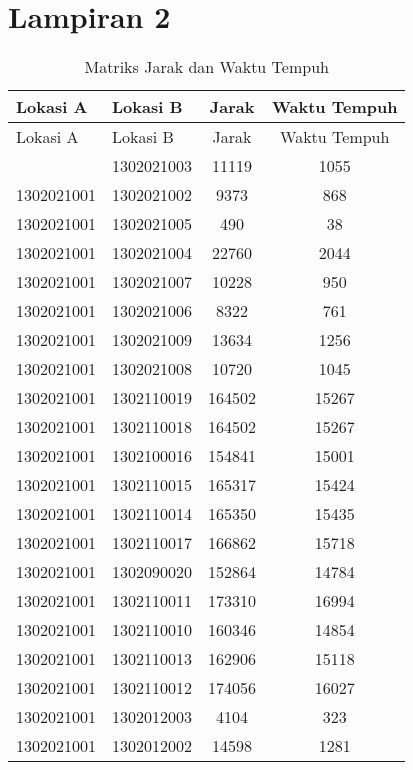 \chapter*{Lampiran 2}


\begin{longtable}[h]{llcc}
	\caption{Matriks Jarak dan Waktu Tempuh}
	\label{tbl:distance_duration_matrix_full}\\
	\toprule
		Lokasi A & Lokasi B & Jarak & Waktu Tempuh\\ 
	\midrule
	\endfirsthead
	\toprule
		Lokasi A & Lokasi B & Jarak & Waktu Tempuh\\ 
	\midrule
	\endhead
	\bottomrule
	\endfoot
		1302021001 & 1302021003 & 11119 & 1055\\
		1302021001 & 1302021002 & 9373 & 868\\
		1302021001 & 1302021005 & 490 & 38\\
		1302021001 & 1302021004 & 22760 & 2044\\
		1302021001 & 1302021007 & 10228 & 950\\
		1302021001 & 1302021006 & 8322 & 761\\
		1302021001 & 1302021009 & 13634 & 1256\\
		1302021001 & 1302021008 & 10720 & 1045\\
		1302021001 & 1302110019 & 164502 & 15267\\
		1302021001 & 1302110018 & 164502 & 15267\\
		1302021001 & 1302100016 & 154841 & 15001\\
		1302021001 & 1302110015 & 165317 & 15424\\
		1302021001 & 1302110014 & 165350 & 15435\\
		1302021001 & 1302110017 & 166862 & 15718\\
		1302021001 & 1302090020 & 152864 & 14784\\
		1302021001 & 1302110011 & 173310 & 16994\\
		1302021001 & 1302110010 & 160346 & 14854\\
		1302021001 & 1302110013 & 162906 & 15118\\
		1302021001 & 1302110012 & 174056 & 16027\\
		1302021001 & 1302012003 & 4104 & 323\\
		1302021001 & 1302012002 & 14598 & 1281\\

\end{longtable}
